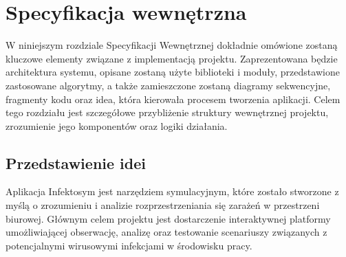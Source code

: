 \chapter{Specyfikacja wewnętrzna}
\label{ch:05}

W niniejszym rozdziale Specyfikacji Wewnętrznej dokładnie omówione zostaną kluczowe elementy związane z implementacją projektu. Zaprezentowana będzie architektura systemu, opisane zostaną użyte biblioteki i moduły, przedstawione zastosowane algorytmy, a także zamieszczone zostaną diagramy sekwencyjne, fragmenty kodu oraz idea, która kierowała procesem tworzenia aplikacji. Celem tego rozdziału jest szczegółowe przybliżenie struktury wewnętrznej projektu, zrozumienie jego komponentów oraz logiki działania.

\section{\textbf{Przedstawienie idei}}

Aplikacja Infektosym jest narzędziem symulacyjnym, które zostało stworzone z myślą o zrozumieniu i analizie rozprzestrzeniania się zarażeń w przestrzeni biurowej. Głównym celem projektu jest dostarczenie interaktywnej platformy umożliwiającej obserwację, analizę oraz testowanie scenariuszy związanych z potencjalnymi wirusowymi infekcjami w środowisku pracy.

